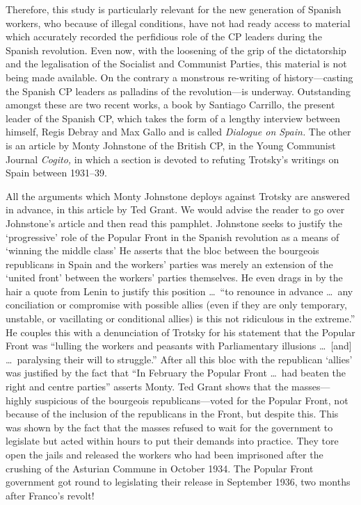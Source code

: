 \documentclass[
  12pt,
  pagesize,
  paper = 6in:9in,
  DIV = 12,
  openany
]{scrbook}
\begin{document}
Therefore, this study is particularly relevant for the new generation
of Spanish workers, who because of illegal conditions, have not
had ready access to material which accurately recorded the perfidious
role of the CP leaders during the Spanish revolution. Even now, with
the loosening of the grip of the dictatorship and the legalisation of
the Socialist and Communist Parties, this material is not being made
available. On the contrary a monstrous re-writing of history---casting
the Spanish CP leaders as palladins of the revolution---is underway.
Outstanding amongst these are two recent works, a book by Santiago
Carrillo, the present leader of the Spanish CP, which takes the
form of a lengthy interview between himself, Regis Debray and Max
Gallo and is called \emph{Dialogue on Spain.} The other is an article by Monty
Johnstone of the British CP, in the Young Communist Journal
\emph{Cogito,} in which a section is devoted to refuting Trotsky’s writings
on Spain between 1931--39.

All the arguments which Monty Johnstone deploys against Trotsky
are answered in advance, in this article by Ted Grant. We would
advise the reader to go over Johnstone’s article and then read this
pamphlet. Johnstone seeks to justify the ‘progressive’ role of the
Popular Front in the Spanish revolution as a means of ‘winning the
middle class’ He asserts that the bloc between the bourgeois
republicans in Spain and the workers’ parties was merely an extension
of the ‘united front’ between the workers’ parties themselves.
He even drags in by the hair a quote from Lenin to justify this position
\dots\ “to renounce in advance \dots\ any conciliation or compromise
with possible allies (even if they are only temporary, unstable, or
vacillating or conditional allies) is this not ridiculous in the extreme.''
He couples this with a denunciation of Trotsky for his statement that
the Popular Front was “lulling the workers and peasants with
Parliamentary illusions \dots\ [and] \dots\ paralysing their will to struggle.''
After all this bloc with the republican ‘allies’ was justified by the
fact that “In February the Popular Front \dots\ had beaten the right
and centre parties'' asserts Monty. Ted Grant shows that the
masses---highly suspicious of the bourgeois republicans---voted for
the Popular Front, not because of the inclusion of the republicans
in the Front, but despite this. This was shown by the fact that the
masses refused to wait for the government to legislate but acted
within hours to put their demands into practice. They tore open the
jails and released the workers who had been imprisoned after the
crushing of the Asturian Commune in October 1934. The Popular
Front government got round to legislating their release in September
1936, two months after Franco’s revolt!
\end{document}
